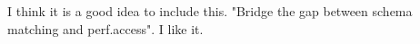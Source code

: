 I think it is a good idea to include this.
"Bridge the gap between schema matching and perf.access". I like it.